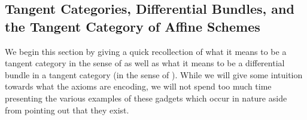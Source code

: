 \documentclass{amsart}
\theoremstyle{definition}
\DeclareMathOperator{\op}{op}
\newcommand{\CAlg}[1]{\mathbf{CAlg}_{#1}}
\DeclareMathOperator{\Sch}{\mathbf{Sch}}
\numberwithin{equation}{subsection}
\begin{document}
\subsection{Tangent Categories, Differential Bundles, and the Tangent Category of Affine Schemes}\label{Subsection: Tan Cat Exposition}

We begin this section by giving a quick recollection of what it means to be a tangent category in the sense of \cite{GeoffRobinDiffStruct} as well as what it means to be a differential bundle in a tangent category (in the sense of \cite{GeoffRobinBundle}). While we will give some intuition towards what the axioms are encoding, we will not spend too much time presenting the various examples of these gadgets which occur in nature aside from pointing out that they exist.
\end{document}
